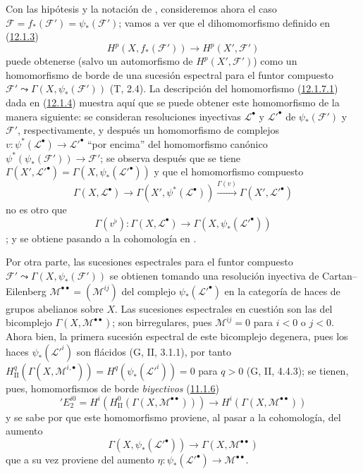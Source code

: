 \begin{env}[12.1.7]
\label{0.12.1.7}
\label{0.12.1.7-fr}
Con las hipótesis y la notación de , consideremos ahora el
caso
$\mathcal F=f_*(\mathcal F')=\psi_*(\mathcal F')$; vamos a ver que el dihomomorfismo definido en (\hyperref[0.12.1.3-fr]{12.1.3}) \[
\label{0.12.1.7.1-fr}
\tag{12.1.7.1}
H^p(X,f_*(\mathcal F'))\longrightarrow H^p(X',\mathcal F')
\]
puede obtenerse (salvo un automorfismo de $H^p(X',\mathcal F')$) como un
homomorfismo de borde de una sucesión espectral para el funtor compuesto
$\mathcal F'\leadsto\Gamma(X,\psi_*(\mathcal F'))$ (T, 2.4). La descripción del homomorfismo (\hyperref[0.12.1.7.1-fr]{12.1.7.1}) dada en (\hyperref[0.12.1.4-fr]{12.1.4}) muestra aquí que se puede obtener este homomorfismo de la manera siguiente: se consideran resoluciones inyectivas $\mathcal L^\bullet$ y
$\mathcal L'^\bullet$ de $\psi_*(\mathcal F')$ y $\mathcal F'$,
respectivamente, y después un homomorfismo de complejos
$v:\psi^*(\mathcal L^\bullet)\to\mathcal L'^\bullet$
``por encima'' del homomorfismo canónico
$\psi^*(\psi_*(\mathcal F'))\to\mathcal F'$;
se observa después que se tiene $\Gamma(X',\mathcal L'^\bullet)=\Gamma(X,\psi_*(\mathcal L'^\bullet))$
y que el homomorfismo compuesto
\[
\Gamma(X,\mathcal L^\bullet)\longrightarrow
\Gamma(X',\psi^*(\mathcal L^\bullet))
\xrightarrow{\Gamma(v)}\Gamma(X',\mathcal L'^\bullet)
\]
no es otro que
\[
\label{0.12.1.7.2-fr}
\tag{12.1.7.2}
\Gamma(v^\flat):\Gamma(X,\mathcal L^\bullet)
\longrightarrow\Gamma(X,\psi_*(\mathcal L'^\bullet))
\]
; y  se
obtiene pasando a la cohomología en .

Por otra parte, las sucesiones espectrales para el funtor compuesto
$\mathcal F'\leadsto\Gamma(X,\psi_*(\mathcal F'))$
se obtienen tomando una resolución inyectiva de Cartan--Eilenberg
$\mathcal M^{\bullet\bullet}=(\mathcal M^{ij})$
del complejo $\psi_*(\mathcal L'^\bullet)$ en la categoría de
haces de grupos abelianos sobre $X$.
Las sucesiones espectrales en cuestión son las del bicomplejo
$\Gamma(X,\mathcal M^{\bullet\bullet})$; son birregulares, pues
$\mathcal M^{ij}=0$ para $i<0$ o $j<0$.
Ahora bien, la primera sucesión espectral de este bicomplejo degenera, pues
los haces $\psi_*(\mathcal L'^i)$ son flácidos (G, II, 3.1.1), por tanto $H_{\mathrm{II}}^q(\Gamma(X,\mathcal M^{i,\bullet}))
=H^q(\psi_*(\mathcal L'^i))=0$ para $q>0$ (G, II, 4.4.3); se tienen, pues, homomorfismos de borde \emph{biyectivos} (\hyperref[0.11.1.6-fr]{11.1.6})
\[
\label{0.12.1.7.3-fr}
\tag{12.1.7.3}
'E_2^{i0}=H^i(H_{\mathrm{II}}^0(\Gamma(X,\mathcal M^{\bullet\bullet})))
\longrightarrow H^i(\Gamma(X,\mathcal M^{\bullet\bullet}))
\]
y se sabe por  que este homomorfismo proviene, al pasar
a la cohomología, del aumento
\[
\label{0.12.1.7.4-fr}
\tag{12.1.7.4}
\Gamma(X,\psi_*(\mathcal L'^\bullet))
\longrightarrow\Gamma(X,\mathcal M^{\bullet\bullet})
\]
que a su vez proviene del aumento
$\eta:\psi_*(\mathcal L'^\bullet)\to\mathcal M^{\bullet\bullet}$.


\end{env}
